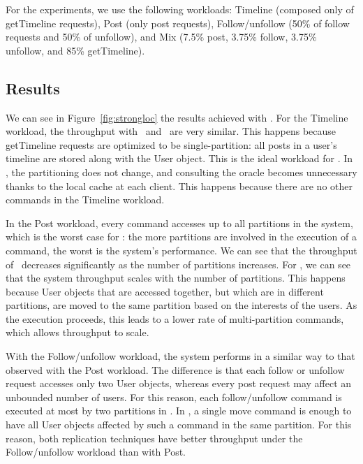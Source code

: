 For the experiments, we use the following workloads:
Timeline (composed only of getTimeline requests),
Post (only post requests),
Follow/unfollow (50\% of follow requests and 50\% of unfollow), and
Mix (7.5\% post, 3.75\% follow, 3.75\% unfollow, and 85\% getTimeline).

\subsection{Results }
\label{sec:evaluation:strongloc}


We can see in Figure~\ref{fig:strongloc} the results achieved with \appname{}.
For the Timeline workload, the throughput with \dssmr\ and \ssmr\ are very similar.
This happens because getTimeline requests are optimized to be single-partition:
all posts in a user's timeline are stored along with the User object.
This is the ideal workload for \ssmr{}.
In \dssmr{}, the partitioning does not change, and consulting the oracle becomes unnecessary thanks to the local cache at each client.
This happens because there are no other commands in the Timeline workload.

In the Post workload, every command accesses up to all partitions in the system, which is the worst case for \ssmr{}: the more partitions are involved in the execution of a command, the worst is the system's performance.
We can see that the throughput of \ssmr\ decreases significantly as the number of partitions increases.
For \dssmr{}, we can see that the system throughput scales with the number of partitions.
This happens because User objects that are accessed together, but which are in different partitions, are moved to the same partition based on the interests of the users.
As the execution proceeds, this leads to a lower rate of multi-partition commands, which allows throughput to scale.

With the Follow/unfollow workload, the system performs in a similar way to that observed with the Post workload.
The difference is that each follow or unfollow request accesses only two User objects, whereas every post request may affect an unbounded number of users.
For this reason, each follow/unfollow command is executed at most by two partitions in \ssmr{}.
In \dssmr{}, a single move command is enough to have all User objects affected by such a command in the same partition.
For this reason, both replication techniques have better throughput under the Follow/unfollow workload than with Post.

